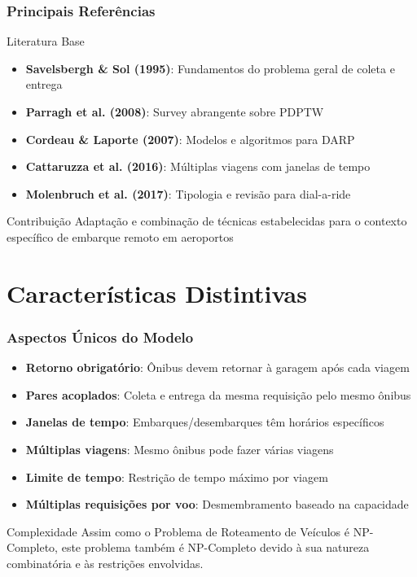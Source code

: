 \documentclass[10pt]{beamer}
\begin{document}
\begin{frame}
\frametitle{Principais Referências}
\begin{block}{Literatura Base}
\begin{itemize}
    \item \textbf{Savelsbergh \& Sol (1995)}: Fundamentos do problema geral de coleta e entrega
    \item \textbf{Parragh et al. (2008)}: Survey abrangente sobre PDPTW
    \item \textbf{Cordeau \& Laporte (2007)}: Modelos e algoritmos para DARP
    \item \textbf{Cattaruzza et al. (2016)}: Múltiplas viagens com janelas de tempo
    \item \textbf{Molenbruch et al. (2017)}: Tipologia e revisão para dial-a-ride
\end{itemize}
\end{block}

\begin{alertblock}{Contribuição}
Adaptação e combinação de técnicas estabelecidas para o contexto específico 
de embarque remoto em aeroportos
\end{alertblock}
\end{frame}

\section{Características Distintivas}

\begin{frame}
\frametitle{Aspectos Únicos do Modelo}
\begin{itemize}
    \item \textbf{Retorno obrigatório}: Ônibus devem retornar à garagem após cada viagem
    \item \textbf{Pares acoplados}: Coleta e entrega da mesma requisição pelo mesmo ônibus
    \item \textbf{Janelas de tempo}: Embarques/desembarques têm horários específicos
    \item \textbf{Múltiplas viagens}: Mesmo ônibus pode fazer várias viagens
    \item \textbf{Limite de tempo}: Restrição de tempo máximo por viagem
    \item \textbf{Múltiplas requisições por voo}: Desmembramento baseado na capacidade
\end{itemize}

\vspace{0.5cm}
\begin{alertblock}{Complexidade}
Assim como o Problema de Roteamento de Veículos é NP-Completo, este problema também é NP-Completo devido à sua natureza combinatória e às restrições envolvidas.
\end{alertblock}
\end{frame}
\end{document}
